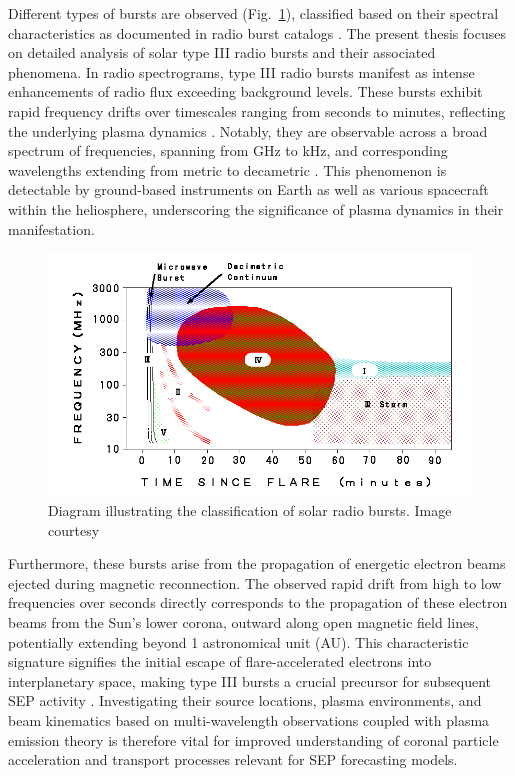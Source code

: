 Different types of bursts are observed (Fig.~\ref{fig_srb_types}), classified based on their spectral characteristics as documented in radio burst catalogs \citep{wild_1963}. The present thesis focuses on detailed analysis of solar type III radio bursts and their associated phenomena.
In radio spectrograms, type III radio bursts manifest as intense enhancements of radio flux exceeding background levels. These bursts exhibit rapid frequency drifts over timescales ranging from seconds to minutes, reflecting the underlying plasma dynamics \citep{reid_2017}. Notably, they are observable across a broad spectrum of frequencies, spanning from GHz to kHz, and corresponding wavelengths extending from metric to decametric \citep{wild_1950a, lecacheux_1989, bonnin_2008}. This phenomenon is detectable by ground-based instruments on Earth as well as various spacecraft within the heliosphere, underscoring the significance of plasma dynamics in their manifestation.

\begin{figure}[!htp]
	\centering
	\includegraphics[width=0.8\columnwidth]{chapter1/figs/typefignew.png}
	\caption[Classification of solar radio bursts]{Diagram illustrating the classification of solar radio bursts. Image courtesy\protect\footnotemark}
	\label{fig_srb_types}
\end{figure}

Furthermore, these bursts arise from the propagation of energetic electron beams ejected during magnetic reconnection. The observed rapid drift from high to low frequencies over seconds directly corresponds to the propagation of these electron beams from the Sun's lower corona, outward along open magnetic field lines, potentially extending beyond 1 astronomical unit (AU). This characteristic signature signifies the initial escape of flare-accelerated electrons into interplanetary space, making type III bursts a crucial precursor for subsequent SEP activity \citep{cane_2002, macdowall_2003}.
Investigating their source locations, plasma environments, and beam kinematics based on multi-wavelength observations coupled with plasma emission theory is therefore vital for improved understanding of coronal particle acceleration and transport processes relevant for SEP forecasting models.

